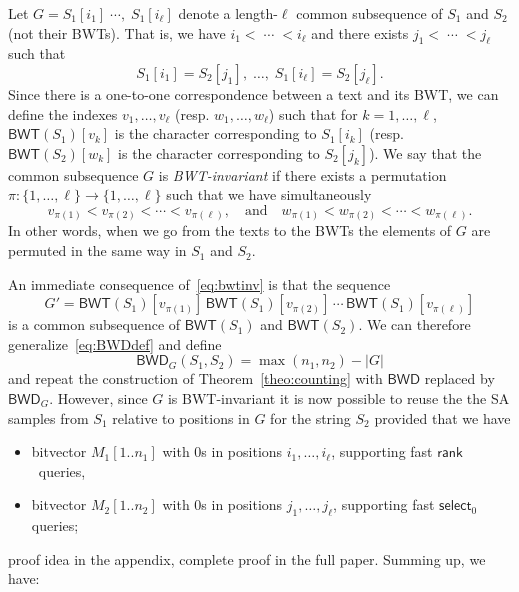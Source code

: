 \documentclass{llncs}
\newcommand{\BWD}
  {\ensuremath{\mathsf{BWD}}}
\newcommand{\BWT}
  {\ensuremath{\mathsf{BWT}}}
\newcommand{\rank}
  {\ensuremath{\mathsf{rank}}}
\newcommand{\select}
  {\ensuremath{\mathsf{select}}}
\begin{document}
Let
\(G = S_1[i_1]\;\cdots,\;S_1[i_\ell]\)
denote a length-$\ell$ common subsequence of $S_1$ and $S_2$ (not their
BWTs). That is, we have $i_1< \;\cdots\; < i_\ell$ and there exists $j_1 <
\;\cdots\; < j_\ell$ such that
$$
S_1[i_1]=S_2[j_1],\;\ldots,\;S_1[i_\ell]=S_2[j_\ell].
$$
Since there is a one-to-one correspondence between a text and its BWT, we can
define the indexes $v_1, \ldots, v_\ell$ (resp. $w_1,\ldots,w_\ell$) such
that for $k=1,\ldots,\ell$, $\BWT(S_1)[v_k]$ is the character corresponding
to $S_1[i_k]$ (resp. $\BWT(S_2)[w_k]$ is the character corresponding to
$S_2[j_k]$). We say that the common subsequence $G$ is {\em BWT-invariant} if
there exists a permutation $\pi: \{1,\ldots,\ell\} \rightarrow
\{1,\ldots,\ell\}$ such that we have simultaneously
\begin{equation}\label{eq:bwtinv}
v_{\pi(1)} < v_{\pi(2)} < \cdots < v_{\pi(\ell)}, \quad\mbox{and}\quad
w_{\pi(1)} < w_{\pi(2)} < \cdots < w_{\pi(\ell)}.
\end{equation}
In other words, when we go from the texts to the BWTs the elements of $G$ are
permuted in the same way in $S_1$ and $S_2$.




An immediate consequence of~\eqref{eq:bwtinv} is that the sequence
$$
G' = \BWT(S_1)[v_{\pi(1)}]\,\BWT(S_1)[v_{\pi(2)}]\,\cdots\,\BWT(S_1)[v_{\pi(\ell)}]
$$
is a common subsequence of $\BWT(S_1)$ and $\BWT(S_2)$. We can therefore
generalize~\eqref{eq:BWDdef} and define
$$
\BWD_G(S_1, S_2) = \max(n_1,n_2) - |G|
$$
and repeat the construction of Theorem~\ref{theo:counting} with $\BWD$
replaced by $\BWD_G$. However, since $G$ is BWT-invariant it is now possible
to reuse the the SA samples from $S_1$ relative to positions in $G$ for the
string $S_2$ provided that we have
\begin{itemize}
\item bitvector \(M_1 [1..n_1]\) with 0s in positions  $i_1, \ldots, i_\ell$,
    supporting fast \rank\ queries,
\item bitvector \(M_2 [1..n_2]\) with 0s in positions $j_1, \ldots,
    j_\ell$, supporting fast $\select_0$ queries;
\end{itemize}
proof idea in the appendix, complete proof in the full paper. Summing up,
we have:
\end{document}

